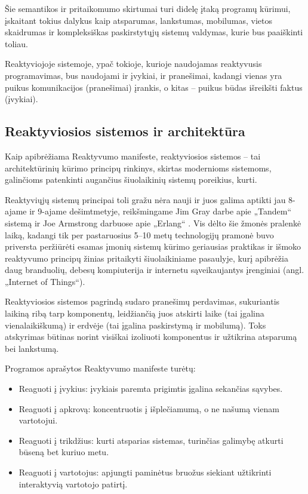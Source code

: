 Šie semantikos ir pritaikomumo skirtumai turi didelę įtaką programų kūrimui, įskaitant tokius dalykus kaip atsparumas, lankstumas, mobilumas, vietos skaidrumas ir kompleksiškas paskirstytųjų sistemų valdymas, kurie bus paaiškinti toliau.

Reaktyviojoje sistemoje, ypač tokioje, kurioje naudojamas reaktyvusis programavimas, bus naudojami ir įvykiai, ir pranešimai, kadangi vienas yra puikus komunikacijos (pranešimai) įrankis, o kitas – puikus būdas išreikšti faktus (įvykiai).

\subsection{Reaktyviosios sistemos ir architektūra}

Kaip apibrėžiama Reaktyvumo manifeste, reaktyviosios sistemos – tai architektūrinių kūrimo principų rinkinys, skirtas modernioms sistemoms, galinčioms patenkinti augančius šiuolaikinių sistemų poreikius, kurti.

Reaktyviųjų sistemų principai toli gražu nėra nauji ir juos galima aptikti jau 8-ajame ir 9-ajame dešimtmetyje, reikšmingame Jim Gray darbe apie „Tandem“ sistemą \cite{Gray85whydo} ir Joe Armstrong darbuose apie „Erlang“ \cite{Armstrong:1997:DE:258948.258967}. Vis dėlto šie žmonės pralenkė laiką, kadangi tik per pastaruosius 5–10 metų technologijų pramonė buvo priversta peržiūrėti esamas įmonių sistemų kūrimo geriausias praktikas ir išmoko reaktyvumo principų žinias pritaikyti šiuolaikiniame pasaulyje, kurį apibrėžia daug branduolių, debesų kompiuterija ir internetu sąveikaujantys įrenginiai (angl. „Internet of Things“).

Reaktyviosios sistemos pagrindą sudaro pranešimų perdavimas, sukuriantis laikiną ribą tarp komponentų, leidžiančią juos atskirti laike (tai įgalina vienalaikiškumą) ir erdvėje (tai įgalina paskirstymą ir mobilumą). Toks atskyrimas būtinas norint visiškai izoliuoti komponentus ir užtikrina atsparumą bei lankstumą.

Programos aprašytos Reaktyvumo manifeste turėtų:

\begin{itemize}
  \item Reaguoti į įvykius: įvykiais paremta prigimtis įgalina sekančias sąvybes.
  \item Reaguoti į apkrovą: koncentruotis į išplečiamumą, o ne našumą vienam vartotojui.
  \item Reaguoti į trikdžius: kurti atsparias sistemas, turinčias galimybę atkurti būseną bet kuriuo metu.
  \item Reaguoti į vartotojus: apjungti paminėtus bruožus siekiant užtikrinti interaktyvią vartotojo patirtį.
\end{itemize}

